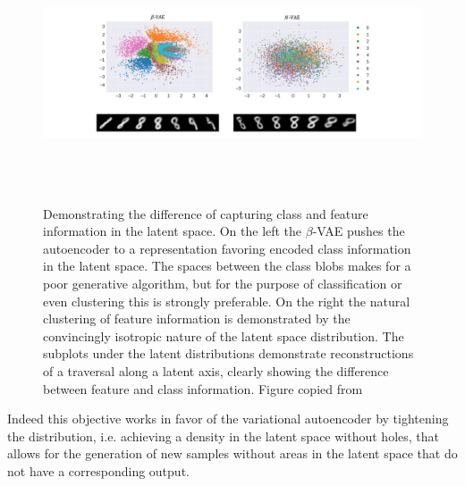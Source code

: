 \begin{figure}
\centering
\includegraphics[width=\textwidth, height=3in]{plots/latent_traversal}
\caption[Difference between generative and discriminative latent spaces]{Demonstrating the difference of capturing class and feature information in the latent space. On the left the $\beta$-VAE pushes the autoencoder to a representation favoring encoded class information in the latent space. The spaces between the class blobs makes for a poor generative algorithm, but for the purpose of classification or even clustering this is strongly preferable. On the right the natural clustering of feature information is demonstrated by the convincingly isotropic nature of the latent space distribution. The subplots under the latent distributions demonstrate reconstructions of a traversal along a latent axis, clearly showing the difference between feature and class information. Figure copied from \citet{Antoran2019}}\label{fig:latent_traversal}
\end{figure}

 Indeed this objective works in favor of the variational autoencoder by tightening the distribution, i.e. achieving a density in the latent space without holes, that allows for the generation of new samples without areas in the latent space that do not have a corresponding output. 

